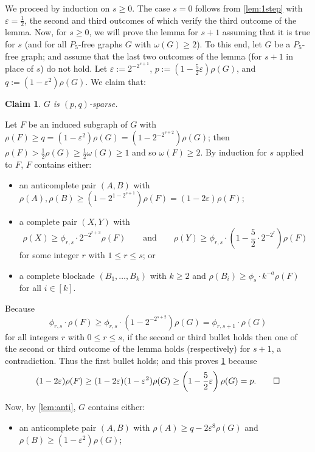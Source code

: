 \documentclass[11pt,reqno]{amsart}
\newtheorem{claim}{Claim}[theorem]
\let\oldendproof\endproof
\renewenvironment{proof}[1][\proofname]{%
	\oldproof[\normalfont\bfseries #1]%
}{\oldendproof}
\renewcommand{\qedsymbol}{$\blacksquare$}%
\newenvironment{subproof}[1][\normalfont\it Subproof]{%
	\renewcommand{\qedsymbol}{$\square$}%
	\begin{proof}[#1]%
	}{%
	\end{proof}%
}
\newcommand{\eps}{\varepsilon}
\begin{document}
	\begin{proof}
		We proceed by induction on $s\ge0$. The case $s=0$ follows from \cref{lem:1step} with $\eps=\frac12$, the second and third outcomes of which verify the third outcome of the lemma.
		Now, for $s\ge0$, we will prove the lemma for $s+1$ assuming that it is true for $s$ (and for all $P_5$-free graphs $G$ with $\omega(G)\ge2$).
		To this end, let $G$ be a $P_5$-free graph; and assume that the last two outcomes of the lemma (for $s+1$ in place of $s$) do not hold. Let $\eps:=2^{-2^{s+1}}$, $p:=(1-\frac52\eps)\rho(G)$, and $q:=(1-\eps^{2})\rho(G)$.
		We claim that:
		\begin{claim}
			\label{claim:incrho}
			$G$ is $(p,q)$-sparse.
		\end{claim}
		\begin{subproof}
			Let $F$ be an induced subgraph of $G$ with $\rho(F)\ge q=(1-\eps^2)\rho(G)=(1-2^{-2^{s+2}})\rho(G)$;
			then $\rho(F)>\frac12\rho(G)\ge\frac12\omega(G)\ge1$ and so $\omega(F)\ge2$.
			By induction for $s$ applied to $F$, $F$ contains either:
			\begin{itemize}
				\item an anticomplete pair $(A,B)$ with $\rho(A),\rho(B)\ge(1-2^{1-2^{s+1}})\rho(F)=(1-2\eps)\rho(F)$;
				
				\item a complete pair $(X,Y)$ with $$\rho(X)\ge\phi_{r,s}\cdot2^{-2^{r+3}}\rho(F)
				\qquad\text{and}\qquad
				\rho(Y)\ge\phi_{r,s}\cdot\left(1-\frac52\cdot2^{-2^{r}}\right)\rho(F)$$
				for some integer $r$ with $1\le r\le s$; or
				
				\item a complete blockade $(B_1,\ldots,B_k)$ with $k\ge2$ and $\rho(B_i)\ge\phi_s\cdot k^{-a}\rho(F)$ for all $i\in[k]$.
			\end{itemize}
			
			Because
			$$\phi_{r,s}\cdot\rho(F)\ge \phi_{r,s}\cdot(1-2^{-2^{s+2}})\rho(G)=\phi_{r,s+1}\cdot\rho(G)$$
			for all integers $r$ with $0\le r\le s$,
			if the second or third bullet holds then one of the second or third outcome of the lemma holds (respectively) for $s+1$, a contradiction.
			Thus the first bullet holds; and this proves \cref{claim:incrho}
			because
			\[(1-2\eps)\rho(F)\ge(1-2\eps)(1-\eps^2)\rho(G)\ge\left(1-\frac52\eps\right)\rho(G)=p.
			\qedhere\]
		\end{subproof}
		
		Now, by \cref{lem:anti}, $G$ contains either:
		\begin{itemize}
			\item an anticomplete pair $(A,B)$ with $\rho(A)\ge q-2\eps^8\rho(G)$ and $\rho(B)\ge(1-\eps^2)\rho(G)$;
			

\end{itemize}
\end{proof}
\end{document}
